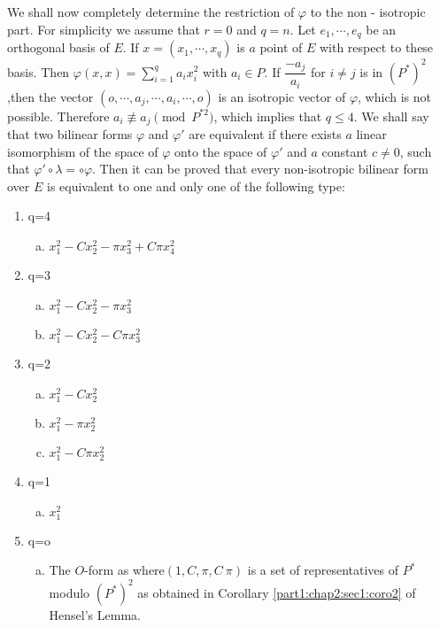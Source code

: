 We shall now  completely determine the restriction of $\varphi$ to the
non - isotropic part. For simplicity we assume that $r=0$ and $q=n$.
Let $ e_1, \cdots, e_q$ be an orthogonal basis  of $E$. If $x= (x_1,
\cdots, x_q) $ is $a$  point of $E$  with respect to these basis. Then
$\varphi (x,x)= \sum \limits _{i=1}^q a_i x_i ^2$ with 
$a_i \in P$. If $ \dfrac{-a_j}{a_i}$ for  $i \neq  j$ is in $
(P^*)^2$,\pageoriginale then the vector $(o, \cdots,  a_j,  \cdots,  a_i,  \cdots, 
o) $ is an isotropic vector of $ \varphi$,  which is not
possible. Therefore $ a_i \nequiv a_j \pmod {P^{*2}}$, which implies
that $q \leq 4$. 
We shall say that two bilinear forms $\varphi$  and $ \varphi '$ are
equivalent if there  exists $a$ linear isomorphism of the space of
$\varphi $ onto the space of $\varphi'$ and $a$  constant $c \neq 0$,
such that $\varphi' \circ \lambda = \circ \varphi$. Then it can be proved
that every non-isotropic bilinear form over $E$ is equivalent to one
and only one of the following type: 
\begin{enumerate}[(1)]
\item q=4
  \begin {enumerate}[(a)]
  \item  $x _1^2 - C x_2^2 - \pi x _3^2 + C\pi x_4 ^2 $\\
  \end {enumerate}
\item q=3	
  \begin {enumerate}[(a)]
  \item  $x _1^2 - C x_2^2 - \pi x _3^2 $
  \item  $x _1^2 - C x_2^2 - C\pi x _3^2 $
  \end {enumerate}
\item q=2
  \begin {enumerate}[(a)]
  \item  $x _1^2 - C x_2^2  $
  \item  $x _1^2 - \pi x_2^2  $
  \item  $x _1^2 - C\pi x_2^2  $
  \end {enumerate}	
\item q=1
  \begin {enumerate}[(a)]
  \item  $x _1^2  $
  \end {enumerate}
\item q=o
  \begin {enumerate}[(a)]
  \item The $O$-form as where\pageoriginale $(1, C, \pi, C ~\pi)$ is a set of
    representatives of $P^\ast$ modulo $(P^\ast)^2$ as obtained in
    Corollary \ref{part1:chap2:sec1:coro2} of Hensel's Lemma. 
  \end {enumerate}	
\end{enumerate}

